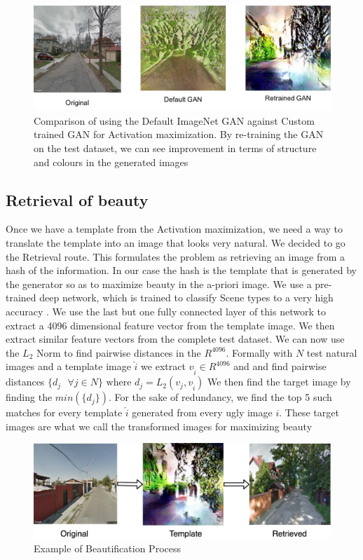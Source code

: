 \begin{figure}[h]
	\centering
	\includegraphics[width=0.7\linewidth]{Plot/GanCompare.png}
	\caption{Comparison of using the Default ImageNet GAN against Custom trained GAN for Activation maximization. By re-training the GAN on the test dataset, we can see improvement in terms of structure and colours in the generated images}
	\label{fig:BeautyExample}
\end{figure}


\subsection{Retrieval of beauty}
Once we have a template from the Activation maximization, we need a way to translate the template into an image that looks very natural. We decided to go the Retrieval route. This formulates the problem as retrieving an image from a hash of the information. In our case the hash is the template that is generated by the generator so as to maximize beauty in the a-priori image. We use a pre-trained deep  network, which is trained to classify Scene types to a very high accuracy \cite{zhou2014learning}. We use the last but one fully connected layer of this network to extract a 4096 dimensional feature vector from the template image. We then extract similar feature vectors from the complete test dataset. We can now use the $L_2$ Norm to find pairwise distances in the $R^{4096}$. Formally with $N$ test natural images and a template image $\hat{i}$ we extract $v_{\hat{i}} \in R^{4096}$ and and find pairwise distances  $\{d_j \text{  }\forall j \in N\} \text{ where } d_j = L_2(v_j , v_{\hat{i}})$ 
We then find the target image by finding the $min(\{d_j\})$. For the sake of redundancy, we find the top 5 such matches for every template $\hat{i}$ generated from every ugly image $i$. These target images are what we call the transformed images for maximizing beauty

\begin{figure}[h]
	\centering
	\includegraphics[width=0.7\linewidth]{Plot/Example.png}
	\caption{Example of Beautification Process}
	\label{fig:BeautyExample}
\end{figure}

